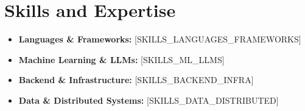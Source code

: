 \documentclass[letterpaper,11pt]{article}
\newcommand{\skillItem}[1]{
  \item\small{
    {#1 \vspace{-2pt}}
  }
}
\begin{document}
\section{Skills and Expertise}
\begin{itemize}[leftmargin=0.15in, label={}]
    \skillItem{ \textbf{Languages \& Frameworks:} [SKILLS_LANGUAGES_FRAMEWORKS]}
          \vspace{-4pt}
    \skillItem{ \textbf{Machine Learning \& LLMs:} [SKILLS_ML_LLMS]}
          \vspace{-4pt}
    \skillItem{ \textbf{Backend \& Infrastructure:} [SKILLS_BACKEND_INFRA]}
          \vspace{-4pt}
    \skillItem{ \textbf{Data \& Distributed Systems:} [SKILLS_DATA_DISTRIBUTED]}
          \vspace{-4pt}
\end{itemize}

\end{document}
